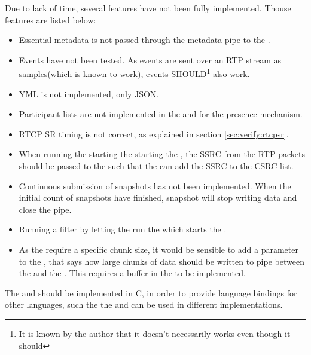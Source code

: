 \noindent{}Due to lack of time, several features have not been fully implemented.
Thouse features are listed below:
\begin{itemize}
	\item Essential metadata is not passed through the metadata pipe to the \con{}.
	\item Events have not been tested. As events are sent over an RTP stream as samples(which is known to work), events SHOULD\footnote{It is known by the author that it doesn't necessarily works even though it should} also work.
	\item YML is not implemented, only JSON.
	\item Participant-lists are not implemented in the \sub{} and \pub{} for the presence mechanism.
	\item RTCP SR timing is not correct, as explained in section \ref{sec:verify:rtcpsr}.
	\item When running the \sub{} starting the \pub{} starting the , the SSRC from the RTP packets should be passed to the \pub{} such that the \pub{} can add the SSRC to the CSRC list. 
	\item Continuous submission of snapshots has not been implemented. When the initial count of snapshots have finished, snapshot will stop writing data and close the pipe.
	\item Running a filter by letting the \sub{} run the \pub{} which starts the .
	\item As the  require a specific chunk size, it would be sensible to add a parameter to the \sub{}, that says how large chunks of data should be written to pipe between the \sub{} and the . This requires a buffer in the \sub{} to be implemented.
\end{itemize}

The \pub{} and \sub{} should be implemented in C, in order to provide language bindings for other languages, such the the \pub{} and \sub{} can be used in different implementations.


